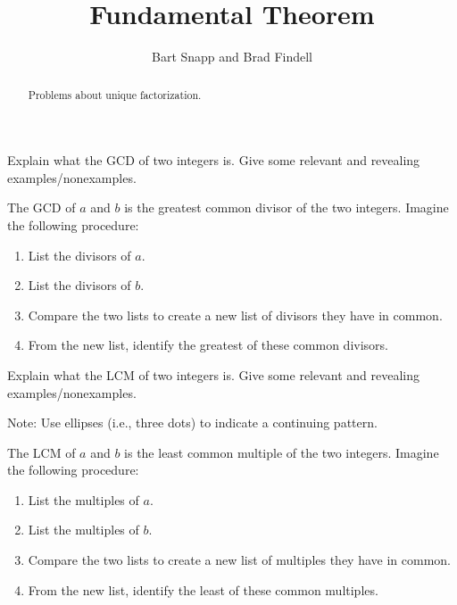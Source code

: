 \documentclass[nooutcomes]{ximera}
\title{Fundamental Theorem}
\author{Bart Snapp and Brad Findell}
\begin{document}
\begin{abstract}
Problems about unique factorization.
\end{abstract}
\maketitle




\begin{problem}
Explain what the GCD of two integers is. Give some relevant and
  revealing examples/nonexamples.
\begin{freeResponse}
\begin{hint}
The GCD of $a$ and $b$ is the greatest common divisor of the two integers.  Imagine the following procedure: 
\begin{enumerate}
\item List the divisors of $a$.  
\item List the divisors of $b$.  
\item Compare the two lists to create a new list of divisors they have in common.  
\item From the new list, identify the greatest of these common divisors.  
\end{enumerate}
\end{hint}
\end{freeResponse}
\end{problem}

\begin{problem}
Explain what the LCM of two integers is. Give some relevant and
  revealing examples/nonexamples.
\begin{freeResponse}
\begin{hint}
Note: Use ellipses (i.e., three dots) to indicate a continuing pattern.

The LCM of $a$ and $b$ is the least common multiple of the two integers.  Imagine the following procedure: 
\begin{enumerate}
\item List the multiples of $a$.   
\item List the multiples of $b$.  
\item Compare the two lists to create a new list of multiples they have in common.  
\item From the new list, identify the least of these common multiples.  
\end{enumerate}
\end{hint}
\end{freeResponse}
\end{problem}
\end{document}
